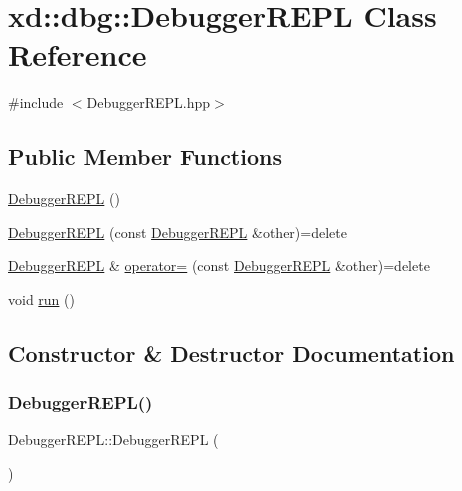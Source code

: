 \hypertarget{classxd_1_1dbg_1_1_debugger_r_e_p_l}{}\section{xd\+:\+:dbg\+:\+:Debugger\+R\+E\+PL Class Reference}
\label{classxd_1_1dbg_1_1_debugger_r_e_p_l}


{\ttfamily \#include $<$Debugger\+R\+E\+P\+L.\+hpp$>$}

\subsection*{Public Member Functions}
\begin{DoxyCompactItemize}
\item 
\mbox{\hyperlink{classxd_1_1dbg_1_1_debugger_r_e_p_l_a5b7f47d2e8bb27f8ac6281a319f611a6}{Debugger\+R\+E\+PL}} ()
\item 
\mbox{\hyperlink{classxd_1_1dbg_1_1_debugger_r_e_p_l_a46729a53647a3a7b7f96c10cf413f61c}{Debugger\+R\+E\+PL}} (const \mbox{\hyperlink{classxd_1_1dbg_1_1_debugger_r_e_p_l}{Debugger\+R\+E\+PL}} \&other)=delete
\item 
\mbox{\hyperlink{classxd_1_1dbg_1_1_debugger_r_e_p_l}{Debugger\+R\+E\+PL}} \& \mbox{\hyperlink{classxd_1_1dbg_1_1_debugger_r_e_p_l_a0ddb74fc0aa4a5adf1ddffc336a8bb6f}{operator=}} (const \mbox{\hyperlink{classxd_1_1dbg_1_1_debugger_r_e_p_l}{Debugger\+R\+E\+PL}} \&other)=delete
\item 
void \mbox{\hyperlink{classxd_1_1dbg_1_1_debugger_r_e_p_l_ac13ec70fda03d6ded9ae47331e25e389}{run}} ()
\end{DoxyCompactItemize}


\subsection{Constructor \& Destructor Documentation}
\mbox{\label{classxd_1_1dbg_1_1_debugger_r_e_p_l_a5b7f47d2e8bb27f8ac6281a319f611a6}} 
\subsubsection{\texorpdfstring{Debugger\+R\+E\+P\+L()}{DebuggerREPL()}\hspace{0.1cm}{\footnotesize\ttfamily [1/2]}}
{\footnotesize\ttfamily Debugger\+R\+E\+P\+L\+::\+Debugger\+R\+E\+PL (\begin{DoxyParamCaption}{ }\end{DoxyParamCaption})}


